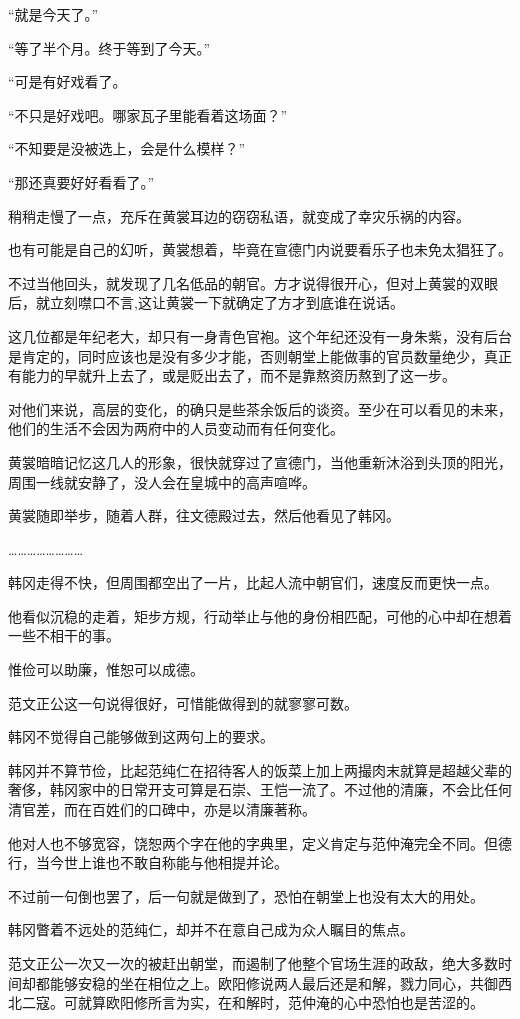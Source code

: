 “就是今天了。”

“等了半个月。终于等到了今天。”

“可是有好戏看了。

“不只是好戏吧。哪家瓦子里能看着这场面？”

“不知要是没被选上，会是什么模样？”

“那还真要好好看看了。”

稍稍走慢了一点，充斥在黄裳耳边的窃窃私语，就变成了幸灾乐祸的内容。

也有可能是自己的幻听，黄裳想着，毕竟在宣德门内说要看乐子也未免太猖狂了。

不过当他回头，就发现了几名低品的朝官。方才说得很开心，但对上黄裳的双眼后，就立刻噤口不言,这让黄裳一下就确定了方才到底谁在说话。

这几位都是年纪老大，却只有一身青色官袍。这个年纪还没有一身朱紫，没有后台是肯定的，同时应该也是没有多少才能，否则朝堂上能做事的官员数量绝少，真正有能力的早就升上去了，或是贬出去了，而不是靠熬资历熬到了这一步。

对他们来说，高层的变化，的确只是些茶余饭后的谈资。至少在可以看见的未来，他们的生活不会因为两府中的人员变动而有任何变化。

黄裳暗暗记忆这几人的形象，很快就穿过了宣德门，当他重新沐浴到头顶的阳光，周围一线就安静了，没人会在皇城中的高声喧哗。

黄裳随即举步，随着人群，往文德殿过去，然后他看见了韩冈。

……………………

韩冈走得不快，但周围都空出了一片，比起人流中朝官们，速度反而更快一点。

他看似沉稳的走着，矩步方规，行动举止与他的身份相匹配，可他的心中却在想着一些不相干的事。

惟俭可以助廉，惟恕可以成德。

范文正公这一句说得很好，可惜能做得到的就寥寥可数。

韩冈不觉得自己能够做到这两句上的要求。

韩冈并不算节俭，比起范纯仁在招待客人的饭菜上加上两撮肉末就算是超越父辈的奢侈，韩冈家中的日常开支可算是石崇、王恺一流了。不过他的清廉，不会比任何清官差，而在百姓们的口碑中，亦是以清廉著称。

他对人也不够宽容，饶恕两个字在他的字典里，定义肯定与范仲淹完全不同。但德行，当今世上谁也不敢自称能与他相提并论。

不过前一句倒也罢了，后一句就是做到了，恐怕在朝堂上也没有太大的用处。

韩冈瞥着不远处的范纯仁，却并不在意自己成为众人瞩目的焦点。

范文正公一次又一次的被赶出朝堂，而遏制了他整个官场生涯的政敌，绝大多数时间却都能够安稳的坐在相位之上。欧阳修说两人最后还是和解，戮力同心，共御西北二寇。可就算欧阳修所言为实，在和解时，范仲淹的心中恐怕也是苦涩的。

